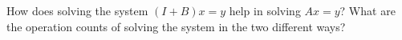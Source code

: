   How does solving the system $(I+B)x=y$ help in solving $Ax=y$? What
  are the operation counts of solving the system in the two different ways?
